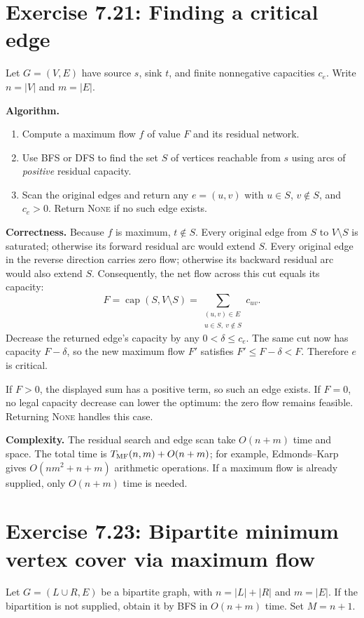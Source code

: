 \documentclass[11pt]{article}
\newcommand{\exercise}[2]{\section*{Exercise #1: #2}}
\newcommand{\capc}{\operatorname{cap}}
\begin{document}
\exercise{7.21}{Finding a critical edge}
Let $G=(V,E)$ have source $s$, sink $t$, and finite nonnegative
capacities $c_e$. Write $n=|V|$ and $m=|E|$.

\textbf{Algorithm.}
\begin{enumerate}[label=\arabic*.]
 \item Compute a maximum flow $f$ of value $F$ and its residual network.
 \item Use BFS or DFS to find the set $S$ of vertices reachable from $s$
       using arcs of \emph{positive} residual capacity.
 \item Scan the original edges and return any $e=(u,v)$ with
       $u\in S$, $v\notin S$, and $c_e>0$. Return \textsc{None}
       if no such edge exists.
\end{enumerate}

\textbf{Correctness.}
Because $f$ is maximum, $t\notin S$. Every original edge from $S$
to $V\setminus S$ is saturated; otherwise its forward residual arc
would extend $S$. Every original edge in the reverse direction carries
zero flow; otherwise its backward residual arc would also extend $S$.
Consequently, the net flow across this cut equals its capacity:
\[
 F=\capc(S,V\setminus S)
   =\sum_{\substack{(u,v)\in E\\u\in S,\ v\notin S}}c_{uv}.
\]
Decrease the returned edge's capacity by any $0<\delta\le c_e$.
The same cut now has capacity $F-\delta$, so the new maximum flow
$F'$ satisfies $F'\le F-\delta<F$. Therefore $e$ is critical.

If $F>0$, the displayed sum has a positive term, so such an edge
exists. If $F=0$, no legal capacity decrease can lower the optimum:
the zero flow remains feasible. Returning \textsc{None} handles this case.

\textbf{Complexity.}
The residual search and edge scan take $O(n+m)$ time and space.
The total time is $T_{\rm MF}(n,m)+O(n+m)$; for example,
Edmonds--Karp gives $O(nm^2+n+m)$ arithmetic operations.
If a maximum flow is already supplied, only $O(n+m)$ time is needed.

\newpage
\exercise{7.23}{Bipartite minimum vertex cover via maximum flow}
Let $G=(L\cup R,E)$ be a bipartite graph, with $n=|L|+|R|$ and
$m=|E|$. If the bipartition is not supplied, obtain it by BFS in
$O(n+m)$ time. Set $M=n+1$.
\end{document}
